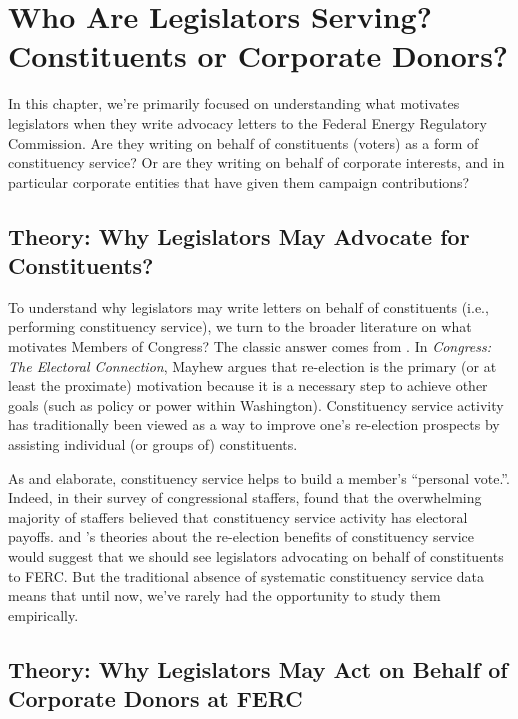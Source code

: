 \documentclass{article}
\begin{document}
\section{Who Are Legislators Serving? Constituents or Corporate Donors?}

  In this chapter, we're primarily focused on understanding what motivates legislators when they write advocacy letters to the Federal Energy Regulatory Commission. Are they writing on behalf of constituents (voters) as a form of constituency service? Or are they writing on behalf of corporate interests, and in particular corporate entities that have given them campaign contributions? 
  
\subsection{Theory: Why Legislators May Advocate for Constituents?}  
  
  To understand why legislators may write letters on behalf of constituents (i.e., performing constituency service), we turn to the broader literature on what motivates Members of Congress?  The classic answer comes from \citet{Mayhew1974}. In \emph{Congress: The Electoral Connection}, Mayhew argues that re-election is the primary (or at least the proximate) motivation because it is a necessary step to achieve other goals (such as policy or power within Washington). Constituency service activity has traditionally been viewed as a way to improve one's re-election prospects by assisting individual (or groups of) constituents.  
  
  As \citet*{CainFerejohnFiorina1984} and \citet*{CainFerejohnFiorina1987} elaborate, constituency service helps to build a member's ``personal vote.''. Indeed, in their survey of congressional staffers, \citet{CainFerejohnFiorina1987} found that the overwhelming majority of staffers believed that constituency service activity has electoral payoffs. \citet{Mayhew1974} and \citet{CainFerejohnFiorina1987}'s theories about the re-election benefits of constituency service would suggest that we should see legislators advocating on behalf of constituents to FERC. But the traditional absence of systematic constituency service data means that until now, we've rarely had the opportunity to study them empirically.  
  
\subsection{Theory: Why Legislators May Act on Behalf of Corporate Donors at FERC}
\end{document}
